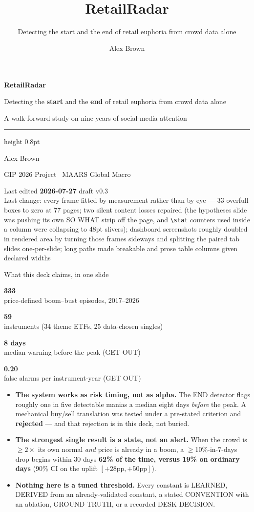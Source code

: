 \documentclass[aspectratio=169,11pt]{beamer}
\title{RetailRadar}
\subtitle{Detecting the start and the end of retail euphoria from crowd data
alone}
\author{Alex Brown}
\institute{GIP 2026 Project \textbullet\ MAARS Global Macro}
\date{\lastedited}
\newcommand{\lastedited}{2026-07-27}
\newcommand{\lastcommit}{%
  every frame fitted by measurement rather than by eye --- 33 overfull boxes to
  zero at 77 pages; two silent content losses repaired (the hypotheses slide was
  pushing its own SO WHAT strip off the page, and \texttt{\textbackslash stat}
  counters used inside a column were collapsing to 48pt slivers); dashboard
  screenshots roughly doubled in rendered area by turning those frames sideways
  and splitting the paired tab slides one-per-slide; long paths made breakable
  and prose table columns given declared widths}
\newcommand{\deckversion}{draft v0.3}
\newcommand{\stat}[3][0.235]{%
  \begin{minipage}[t]{#1\linewidth}
    {\color{gicnavy}\fontsize{22}{24}\selectfont\bfseries #2}\\[0.15em]
    {\color{giclight}\scriptsize #3}
  \end{minipage}}
\begin{document}
\begin{frame}[plain]
  \vspace{1.2em}
  {\color{gicnavy}\fontsize{30}{34}\selectfont\bfseries RetailRadar\par}
  \vspace{0.4em}
  {\color{gicink}\large Detecting the \textbf{start} and the \textbf{end} of
   retail euphoria from crowd data alone\par}
  \vspace{0.3em}
  {\color{gicgrey}\normalsize A walk-forward study on nine years of
   social-media attention\par}
  \vspace{1.4em}
  {\color{gicrule}\hrule height 0.8pt}
  \vspace{0.9em}
  {\color{gicink}\normalsize Alex Brown\par}
  {\color{gicgrey}\small GIP 2026 Project \textbullet\ MAARS Global Macro\par}
  \vspace{1.2em}
  {\color{giclight}\scriptsize
   Last edited \textbf{\lastedited} \quad\textbullet\quad \deckversion\\[0.3em]
   Last change: \lastcommit\par}
\end{frame}

\begin{frame}{What this deck claims, in one slide}
  \vspace{0.2em}
  \stat{333}{price-defined boom--bust episodes, 2017--2026}\hfill
  \stat{59}{instruments (34 theme ETFs, 25 data-chosen singles)}\hfill
  \stat{8 days}{median warning before the peak (GET OUT)}\hfill
  \stat{0.20}{false alarms per instrument-year (GET OUT)}
  \vspace{1.2em}

  \begin{itemize}\small
    \item \textbf{The system works as risk timing, not as alpha.} The END
      detector flags roughly one in five detectable manias a median eight days
      \emph{before} the peak. A mechanical buy/sell translation was tested
      under a pre-stated criterion and \textbf{rejected} --- and that
      rejection is in this deck, not buried.
    \item \textbf{The strongest single result is a state, not an alert.} When
      the crowd is $\geq 2\times$ its own normal \emph{and} price is already
      in a boom, a $\geq$10\%-in-7-days drop begins within 30 days
      \textbf{62\% of the time, versus 19\% on ordinary days}
      (90\% CI on the uplift $[+28\text{pp}, +50\text{pp}]$).
    \item \textbf{Nothing here is a tuned threshold.} Every constant is
      LEARNED, DERIVED from an already-validated constant, a stated
      CONVENTION with an ablation, GROUND TRUTH, or a recorded DESK DECISION.
  \end{itemize}
\end{frame}
\end{document}
